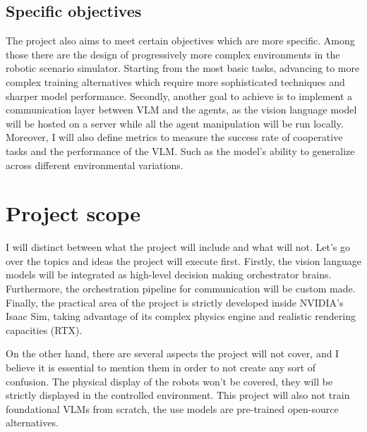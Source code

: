 \subsection{Specific objectives} %
The project also aims to meet certain objectives which are more specific. Among those there are the design of progressively more complex environments in the robotic scenario simulator. Starting from the most basic tasks, advancing to more complex training alternatives which require more sophisticated techniques and sharper model performance. Secondly, another goal to achieve is to implement a communication layer between VLM and the agents, as the vision language model will be hosted on a server while all the agent manipulation will be run locally. Moreover, I will also define metrics to measure the success rate of cooperative tasks and the performance of the VLM. Such as the model's ability to generalize across different environmental variations. 

\section{Project scope}
I will distinct between what the project will include and what will not. Let's go over the topics and ideas the project will execute first. Firstly, the vision language models will be integrated as high-level decision making orchestrator brains. Furthermore, the orchestration pipeline for communication will be custom made. Finally, the practical area of the project is strictly developed inside NVIDIA's Isaac Sim, taking advantage of its complex physics engine and realistic rendering capacities (RTX).

On the other hand, there are several aspects the project will not cover, and I believe it is essential to mention them in order to not create any sort of confusion. The physical display of the robots won't be covered, they will be strictly displayed in the controlled environment. This project will also not train foundational VLMs from scratch, the use models are pre-trained open-source alternatives. 